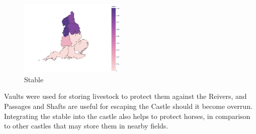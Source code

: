 \documentclass[11pt]{article}
\begin{document}
\begin{figure}[H]
	\centering
	\includegraphics[width=0.45\textwidth]{stable.png}
	\caption{Stable}
\end{figure}

Vaults were used for storing livestock to protect them against the Reivers, and Passages and Shafts are useful for escaping the Castle should it become overrun. Integrating the stable into the castle also helps to protect horses, in comparison to other castles that may store them in nearby fields.







\end{document}
